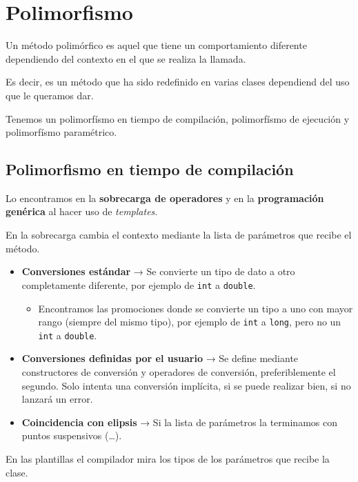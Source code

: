 \chapter{Polimorfismo}

Un método polimórfico es aquel que tiene un comportamiento diferente dependiendo del contexto en el que se realiza la llamada.

Es decir, es un método que ha sido redefinido en varias clases dependiend del uso que le queramos dar.

Tenemos un polimorfísmo en tiempo de compilación, polimorfísmo de ejecución y polimorfísmo paramétrico.

\section{Polimorfismo en tiempo de compilación}
Lo encontramos en la \textbf{sobrecarga de operadores} y en la \textbf{programación genérica} al hacer uso de \textit{templates}.

En la sobrecarga cambia el contexto mediante la lista de parámetros que recibe el método.
\begin{itemize}
	\item \textbf{Conversiones estándar} → Se convierte un tipo de dato a otro completamente diferente, por ejemplo de \texttt{int} a \texttt{double}.
	\begin{itemize}
		\item Encontramos las promociones donde se convierte un tipo a uno con mayor rango (siempre del mismo tipo), por ejemplo de \texttt{int} a \texttt{long}, pero no un \texttt{int} a \texttt{double}. 
	\end{itemize}	
	\item \textbf{Conversiones definidas por el usuario} → Se define mediante constructores de conversión y operadores de conversión, preferiblemente el segundo. Solo intenta una conversión implícita, si se puede realizar bien, si no lanzará un error.
	\item \textbf{Coincidencia con elipsis} → Si la lista de parámetros la terminamos con puntos suspensivos (…). 
\end{itemize}
En las plantillas el compilador mira los tipos de los parámetros que recibe la clase.

